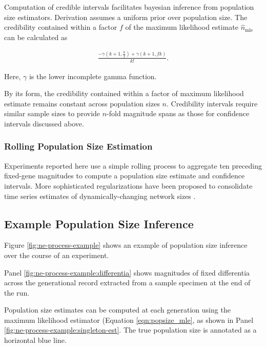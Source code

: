 Computation of credible intervals facilitates bayesian inference from population size estimators.
Derivation assumes a uniform prior over population size.
The credibility contained within a factor $f$ of the maximum likelihood estimate $\hat{n}_\mathrm{mle}$ can be calculated as


\begin{align*}
\frac{- \gamma(k + 1, \frac{k}{f}) + \gamma(k + 1, f k)}{k!}.
\end{align*}

Here, $\gamma$ is the lower incomplete gamma function.

By its form, the credibility contained within a factor of maximum likelihood estimate remains constant across population sizes $n$.
Credibility intervals require similar sample sizes to provide $n$-fold magnitude spans as those for confidence intervals discussed above.

\subsubsection{Rolling Population Size Estimation} \label{sec:rolling_estimation}

Experiments reported here use a simple rolling process to aggregate ten preceding fixed-gene magnitudes to compute a population size estimate and confidence intervals.
More sophisticated regularizations have been proposed to consolidate time series estimates of dynamically-changing network sizes \citep{hakan2012distributed}.

\subsection{Example Population Size Inference}
\label{sec:ne-process-example}



Figure \ref{fig:ne-process-example} shows an example of population size inference over the course of an experiment.

Panel \ref{fig:ne-process-example:differentia} shows magnitudes of fixed differentia across the generational record extracted from a sample specimen at the end of the run.

Population size estimates can be computed at each generation using the maximum likelihood estimator (Equation \ref{eqn:popsize_mle}, as shown in Panel \ref{fig:ne-process-example:singleton-est}.
The true population size is annotated as a horizontal blue line.

